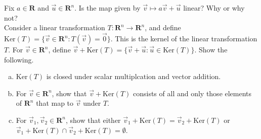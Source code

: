 \documentclass[a4paper,11pt]{article}
\newcommand{\R}{\mathbf{R}}
\begin{document}
 Fix $a \in \R$ and $\vec u \in \R^n$. Is the map
given by $\vec v \mapsto a\vec v + \vec u$ linear? Why or why not? \\

 Consider a linear transformation $T: \R^n
\rightarrow \R^n$, and define $\text{Ker}(T)=\{\vec v \in \R^n : T(\vec v)=\vec
0\}$. This is the kernel of the linear transformation $T$. For $\vec v \in
\R^n$, define $\vec v + \text{Ker}(T)=\{\vec v + \vec u : \vec u \in
\text{Ker}(T)\}$. Show the following.
\begin{enumerate}[(a)]
\item $\text{Ker}(T)$ is closed under scalar multiplcation and vector addition.
\item For $\vec v \in \R^n$, show that $\vec v + \text{Ker}(T)$ consists of all
  and only those elements of $\R^n$ that map to $\vec v$ under $T$.
\item For $\vec v_1,\vec v_2 \in \R^n$, show that either $\vec
  v_1+\text{Ker}(T)=\vec v_2 +\text{Ker}(T)$ or $\vec v_1+\text{Ker}(T) \cap
  \vec v_2 +\text{Ker}(T)=\emptyset$.
\end{enumerate}
\end{document}
